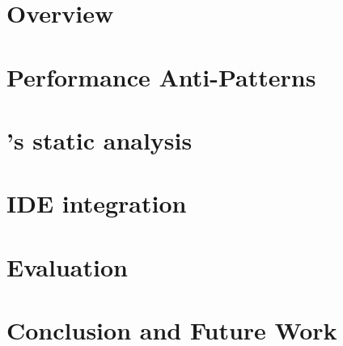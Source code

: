 
\section{Overview}


%
\section{Performance Anti-Patterns}



\section{\Tool's static analysis}


\section{\Tool IDE integration}


\section{Evaluation}



\vspace{-2mm}
\section{Conclusion and Future Work}
